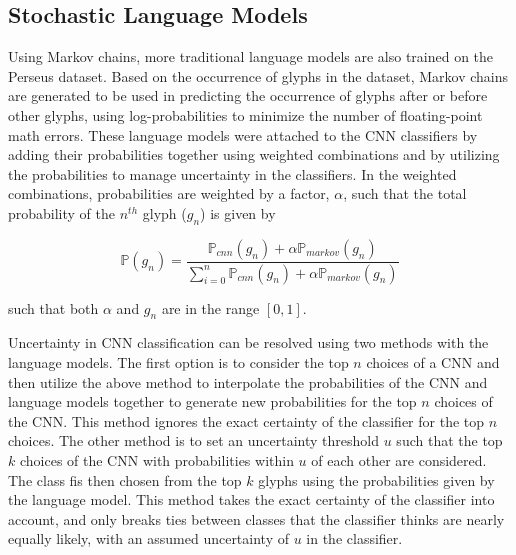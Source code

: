 \subsection{Stochastic Language Models}
Using Markov chains, more traditional language models are also trained on the Perseus dataset. Based on the occurrence of glyphs in the dataset, Markov chains are generated to be used in predicting the occurrence of glyphs after or before other glyphs, using log-probabilities to minimize the number of floating-point math errors. These language models were attached to the CNN classifiers by adding their probabilities together using weighted combinations and by utilizing the probabilities to manage uncertainty in the classifiers. In the weighted combinations, probabilities are weighted by a factor, $\alpha$, such that the total probability of the $n^{th}$ glyph ($g_n$) is given by

\begin{equation}
\mathbb{P}(g_n)=\frac{\mathbb{P}_{cnn}(g_n)+\alpha\mathbb{P}_{markov}(g_n)}{\sum_{i=0}^{n}{\mathbb{P}_{cnn}(g_n)+\alpha\mathbb{P}_{markov}(g_n)}}
\end{equation}

such that both $\alpha$ and $g_n$ are in the range $[0,1]$.

Uncertainty in CNN classification can be resolved using two methods with the language models. The first option is to consider the top $n$ choices of a CNN and then utilize the above method to interpolate the probabilities of the CNN and language models together to generate new probabilities for the top $n$ choices of the CNN. This method ignores the exact certainty of the classifier for the top $n$ choices. The other method is to set an uncertainty threshold $u$ such that the top $k$ choices of the CNN with probabilities within $u$ of each other are considered. The class fis then chosen from the top $k$ glyphs using the probabilities given by the language model. This method takes the exact certainty of the classifier into account, and only breaks ties between classes that the classifier thinks are nearly equally likely, with an assumed uncertainty of $u$ in the classifier.

%
